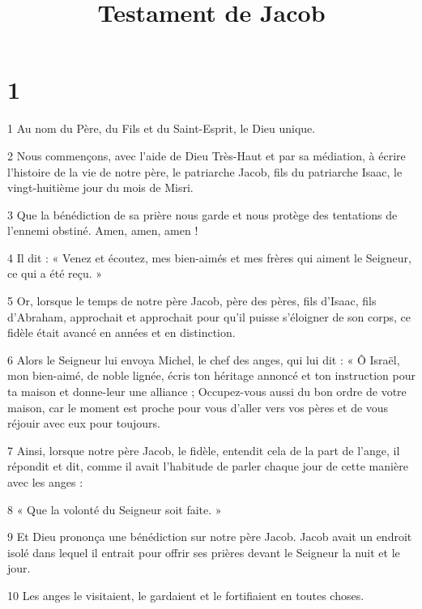 


\title{Testament de Jacob}

\chapter{1}

\par 1 Au nom du Père, du Fils et du Saint-Esprit, le Dieu unique.

\par 2 Nous commençons, avec l'aide de Dieu Très-Haut et par sa médiation, à écrire l'histoire de la vie de notre père, le patriarche Jacob, fils du patriarche Isaac, le vingt-huitième jour du mois de Misri.

\par 3 Que la bénédiction de sa prière nous garde et nous protège des tentations de l'ennemi obstiné. Amen, amen, amen !

\par 4 Il dit : « Venez et écoutez, mes bien-aimés et mes frères qui aiment le Seigneur, ce qui a été reçu. »

\par 5 Or, lorsque le temps de notre père Jacob, père des pères, fils d'Isaac, fils d'Abraham, approchait et approchait pour qu'il puisse s'éloigner de son corps, ce fidèle était avancé en années et en distinction.

\par 6 Alors le Seigneur lui envoya Michel, le chef des anges, qui lui dit : « Ô Israël, mon bien-aimé, de noble lignée, écris ton héritage annoncé et ton instruction pour ta maison et donne-leur une alliance ; Occupez-vous aussi du bon ordre de votre maison, car le moment est proche pour vous d'aller vers vos pères et de vous réjouir avec eux pour toujours.

\par 7 Ainsi, lorsque notre père Jacob, le fidèle, entendit cela de la part de l'ange, il répondit et dit, comme il avait l'habitude de parler chaque jour de cette manière avec les anges :

\par 8 « Que la volonté du Seigneur soit faite. »

\par 9 Et Dieu prononça une bénédiction sur notre père Jacob. Jacob avait un endroit isolé dans lequel il entrait pour offrir ses prières devant le Seigneur la nuit et le jour.

\par 10 Les anges le visitaient, le gardaient et le fortifiaient en toutes choses.

